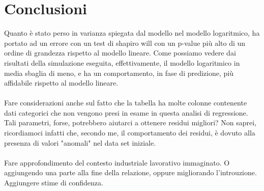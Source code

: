 \documentclass[11pt,a4paper]{article}
\begin{document}
\section{Conclusioni}
Quanto \`e stato perso in varianza spiegata dal modello nel modello
logaritmico, ha portato ad un errore con un test di shapiro will con un
p-value pi\`u alto di un ordine di grandezza rispetto al modello lineare. Come
possiamo vedere dai risultati della simulazione eseguita, effettivamente, il
modello logaritmico in media sbaglia di meno, e ha un comportamento, in fase di
predizione, pi\`u affidabile rispetto al modello lineare.\\
\\
Fare considerazioni anche sul fatto che la tabella ha molte colonne contenente
dati categorici che non vengono presi in esame in questa analisi di regressione.
Tali parametri, forse, potrebbero aiutarci a ottenere residui migliori? Non
saprei, ricordiamoci infatti che, secondo me, il comportamento dei residui, \`e
dovuto alla presenza di valori "anomali" nel data set iniziale.\\
\\
Fare approfondimento del contesto industriale lavorativo immaginato. O
aggiungendo una parte alla fine della relazione, oppure migliorando
l'introuzione. Aggiungere stime di confidenza.
\end{document}

